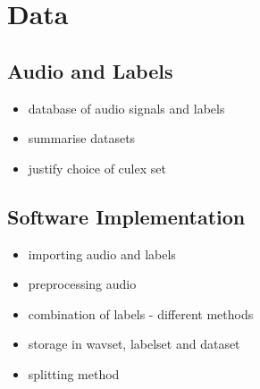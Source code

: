 \section{Data}
\label{sec:pl-data}

    \subsection{Audio and Labels}
    \label{subsec:pl-data-audiolbls}
        \begin{itemize}
            \item{database of audio signals and labels}
            \item{summarise datasets}
            \item{justify choice of culex set}
        \end{itemize}
    
    \subsection{Software Implementation}
    \label{subsec:pl-data-software}
        \begin{itemize}
            \item{importing audio and labels}
            \item{preprocessing audio}
            \item{combination of labels - different methods}
            \item{storage in wavset, labelset and dataset}
            \item{splitting method}
        \end{itemize}